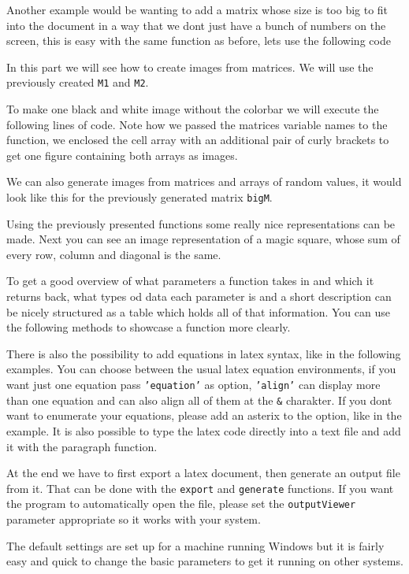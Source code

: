 
Another example would be wanting to add a matrix whose size is too big to fit into the document in a way that we 
dont just have a bunch of numbers on the screen, this is easy with the same function as before, lets use the following code
 

In this part we will see how to create images from matrices. We will use the previously created {\tt M1} and {\tt M2}.


To make one black and white image without the colorbar we will execute the following lines of code. Note how we passed the 
matrices variable names to the function, we enclosed the cell array with an additional pair of curly brackets to get one 
figure containing both arrays as images.


We can also generate images from matrices and arrays of random values, it would look like this for the previously generated
matrix {\tt bigM}.


Using the previously presented functions some really nice representations can be made. Next you can see an image representation
of a magic square, whose sum of every row, column and diagonal is the same.


To get a good overview of what parameters a function takes in and which it returns back, what types od data each parameter is
and a short description can be nicely structured as a table which holds all of that information. You can use the following 
methods to showcase a function more clearly. 


There is also the possibility to add equations in latex syntax, like in the following examples. You can choose between the 
usual latex equation environments, if you want just one equation pass {\tt 'equation'} as option, {\tt 'align'} can display
more than one equation and can also align all of them at the {\tt \&} charakter. If you dont want to enumerate your equations, please
add an asterix to the option, like in the example. It is also possible to type the latex code directly into a text file and 
add it with the paragraph function.


At the end we have to first export a latex document, then generate an output file from it. That can be done with the {\tt export} and
{\tt generate} functions. If you want the program to automatically open the file, please set the {\tt outputViewer} parameter
appropriate so it works with your system.


The default settings are set up for a machine running Windows but it is fairly easy and quick to change the basic parameters to get it 
running on other systems.






